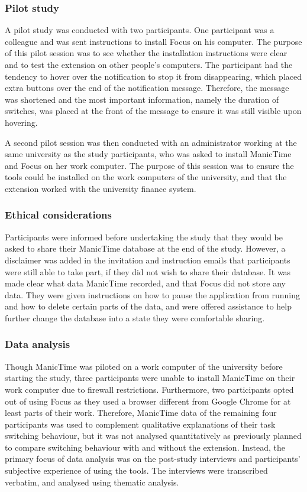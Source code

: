 \subsubsection{Pilot study}
A pilot study was conducted with two participants. One participant was a colleague and was sent instructions to install Focus on his computer. The purpose of this pilot session was to see whether the installation instructions were clear and to test the extension on other people's computers. The participant had the tendency to hover over the notification to stop it from disappearing, which placed extra buttons over the end of the notification message. Therefore, the message was shortened and the most important information, namely the duration of switches, was placed at the front of the message to ensure it was still visible upon hovering.

A second pilot session was then conducted with an administrator working at the same university as the study participants, who was asked to install ManicTime and Focus on her work computer. The purpose of this session was to ensure the tools could be installed on the work computers of the university, and that the extension worked with the university finance system.


\subsubsection{Ethical considerations}
Participants were informed before undertaking the study that they would be asked to share their ManicTime database at the end of the study. However, a disclaimer was added in the invitation and instruction emails that participants were still able to take part, if they did not wish to share their database. It was made clear what data ManicTime recorded, and that Focus did not store any data. They were given instructions on how to pause the application from running and how to delete certain parts of the data, and were offered assistance to help further change the database into a state they were comfortable sharing. 

\subsubsection{Data analysis}
Though ManicTime was piloted on a work computer of the university before starting the study, three participants were unable to install ManicTime on their work computer due to firewall restrictions. Furthermore, two participants opted out of using Focus as they used a browser different from Google Chrome for at least parts of their work. Therefore, ManicTime data of the remaining four participants was used to complement qualitative explanations of their task switching behaviour, but it was not analysed quantitatively as previously planned to compare switching behaviour with and without the extension. Instead, the primary focus of data analysis was on the post-study interviews and participants' subjective experience of using the tools. The interviews were transcribed verbatim, and analysed using thematic analysis.
